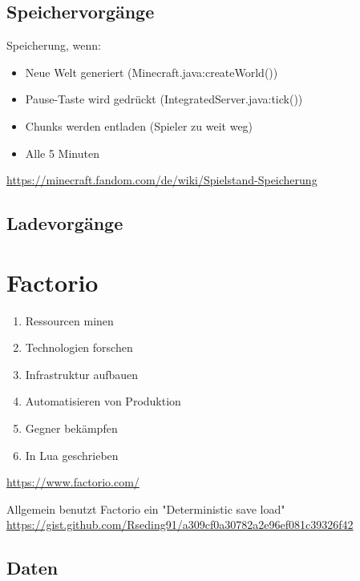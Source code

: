 \subsection{Speichervorgänge}

Speicherung, wenn:
\begin{itemize}
    \item Neue Welt generiert (Minecraft.java:createWorld())
    \item Pause-Taste wird gedrückt (IntegratedServer.java:tick())
    \item Chunks werden entladen (Spieler zu weit weg)
    \item Alle 5 Minuten
\end{itemize}

\url{https://minecraft.fandom.com/de/wiki/Spielstand-Speicherung}

\subsection{Ladevorgänge}



\section{Factorio}
\begin{enumerate}
    \item Ressourcen minen 
    \item Technologien forschen
    \item Infrastruktur aufbauen
    \item Automatisieren von Produktion
    \item Gegner bekämpfen
    \item In Lua geschrieben
\end{enumerate}
\url{https://www.factorio.com/}

Allgemein benutzt Factorio ein "Deterministic save load"
\url{https://gist.github.com/Rseding91/a309cf0a30782a2e96ef081c39326f42}


\subsection{Daten}

